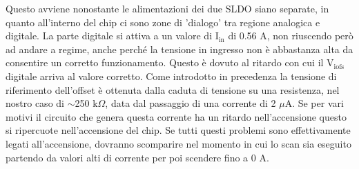 Questo avviene nonostante le alimentazioni dei due SLDO siano separate, in quanto all'interno del chip ci sono zone di 'dialogo' tra regione analogica e digitale. 
La parte digitale si attiva a un valore di $\mathrm{I_{in}}$ di 0.56 A, non riuscendo però ad andare a regime, anche perché la tensione in ingresso non è abbastanza alta da consentire un corretto funzionamento.
Questo è dovuto al ritardo con cui il $\mathrm{V_{iofs}}$ digitale arriva al valore corretto. Come introdotto in precedenza la tensione di riferimento dell'offset è ottenuta dalla caduta di tensione su una resistenza, nel nostro caso di $\sim$250 k$\Omega$, data dal passaggio di una corrente di 2 $\mu$A. Se per vari motivi il circuito che genera questa corrente ha un ritardo nell'accensione questo si ripercuote nell'accensione del chip.  
Se tutti questi problemi sono effettivamente legati all'accensione, dovranno scomparire nel momento in cui lo scan sia eseguito partendo da valori alti di corrente per poi scendere fino a 0 A.

% 
%
%


